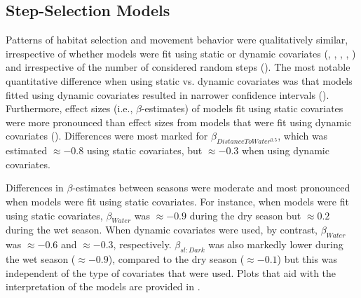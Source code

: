 \documentclass[../FinalThesis.tex]{subfiles}
\begin{document}
\subsection{Step-Selection Models}

Patterns of habitat selection and movement behavior were qualitatively similar,
irrespective of whether models were fit using static or dynamic covariates
(, , ,
, ) and irrespective of the
number of considered random steps (). The most notable
quantitative difference when using static vs. dynamic covariates was that models
fitted using dynamic covariates resulted in narrower confidence intervals
(). Furthermore, effect sizes (i.e., $\beta$-estimates)
of models fit using static covariates were more pronounced than effect sizes
from models that were fit using dynamic covariates ().
Differences were most marked for $\beta_{DistanceToWater^{0.5}}$, which was
estimated $\approx -0.8$ using static covariates, but $\approx -0.3$ when using
dynamic covariates.

Differences in $\beta$-estimates between seasons were moderate and most
pronounced when models were fit using static covariates. For instance, when
models were fit using static covariates, $\beta_{Water}$ was $\approx -0.9$
during the dry season but $\approx 0.2$ during the wet season. When dynamic
covariates were used, by contrast, $\beta_{Water}$ was $\approx -0.6$ and
$\approx -0.3$, respectively. $\beta_{sl:Dark}$ was also markedly lower during
the wet season ($\approx -0.9$), compared to the dry season ($\approx -0.1$) but
this was independent of the type of covariates that were used. Plots that aid
with the interpretation of the models are provided in
.
\end{document}
